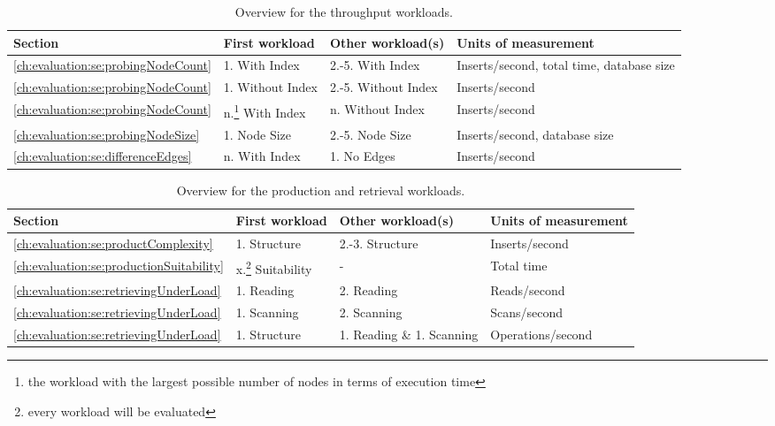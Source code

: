 \begin{table}
  \begin{minipage}{\textwidth}
    \centering
    \begin{tabularx}{\textwidth}{ | l | l | l | X | }
      \hline
      Section & First workload & Other workload(s) & Units of measurement \\ \hline
      \ref{ch:evaluation:se:probingNodeCount} & 1. With Index & 2.-5. With Index & Inserts/second, total time, database size \\ \hline
      \ref{ch:evaluation:se:probingNodeCount} & 1. Without Index & 2.-5. Without Index & Inserts/second \\ \hline
      \ref{ch:evaluation:se:probingNodeCount} & n.\footnote{the workload with the largest possible number of nodes in terms of execution time} With Index & n. Without Index & Inserts/second \\ \hline
      \ref{ch:evaluation:se:probingNodeSize} & 1. Node Size & 2.-5. Node Size & Inserts/second, database size \\ \hline
      \ref{ch:evaluation:se:differenceEdges} & n. With Index & 1. No Edges & Inserts/second \\ \hline
    \end{tabularx}
  \end{minipage}
  \caption{Overview for the throughput workloads.}
  \label{tab:throughputOverview}
\end{table}
\begin{table}
  \begin{minipage}{\textwidth}
    \centering
    \begin{tabularx}{\textwidth}{ | l | l | X | X | }
      \hline
      Section & First workload & Other workload(s) & Units of measurement \\ \hline
      \ref{ch:evaluation:se:productComplexity} & 1. Structure & 2.-3. Structure & Inserts/second \\ \hline
      \ref{ch:evaluation:se:productionSuitability} & x.\footnote{every workload will be evaluated} Suitability & - & Total time \\ \hline
      \ref{ch:evaluation:se:retrievingUnderLoad} & 1. Reading & 2. Reading & Reads/second \\ \hline
      \ref{ch:evaluation:se:retrievingUnderLoad} & 1. Scanning & 2. Scanning & Scans/second \\ \hline
      \ref{ch:evaluation:se:retrievingUnderLoad} & 1. Structure & 1. Reading \& 1. Scanning & Operations/second \\ \hline
    \end{tabularx}
  \end{minipage}
  \caption{Overview for the production and retrieval workloads.}
  \label{tab:productionOverview}
\end{table}

